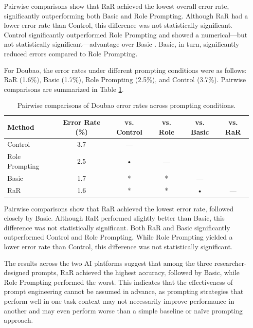 \documentclass[english]{textolivre}
\begin{document}
Pairwise comparisons show that RaR achieved the lowest overall error rate, significantly outperforming both Basic and Role Prompting. Although RaR had a lower error rate than Control, this difference was not statistically significant. Control significantly outperformed Role Prompting and showed a numerical—but not statistically significant—advantage over Basic . Basic, in turn, significantly reduced errors compared to Role Prompting.


For Doubao, the error rates under different prompting conditions were as follows: RaR (1.6\%), Basic (1.7\%), Role Prompting (2.5\%), and Control (3.7\%). Pairwise comparisons are summarized in Table \ref{tab2}.

\begin{table}[htpb]
\centering
\begin{threeparttable}
\caption{Pairwise comparisons of Doubao error rates across prompting conditions.}
\label{tab2}
\begin{tabular}{lccccc} 
\hline
Method         & Error Rate (\%) & vs. Control & vs. Role & vs. Basic & vs. RaR  \\ 
\hline
Control        & 3.7             & —           &          &           &          \\
Role Prompting & 2.5             & •           & —        &           &          \\
Basic          & 1.7             & *           & *        & —         &          \\
RaR            & 1.6             & *           & *        & •          & —        \\
\hline
\end{tabular}
\end{threeparttable}
\end{table}

Pairwise comparisons show that RaR achieved the lowest error rate, followed closely by Basic. Although RaR performed slightly better than Basic, this difference was not statistically significant. Both RaR and Basic significantly outperformed Control and Role Prompting. While Role Prompting yielded a lower error rate than Control, this difference was not statistically significant.

The results across the two AI platforms suggest that among the three researcher-designed prompts, RaR achieved the highest accuracy, followed by Basic, while Role Prompting performed the worst. This indicates that the effectiveness of prompt engineering cannot be assumed in advance, as prompting strategies that perform well in one task context may not necessarily improve performance in another and may even perform worse than a simple baseline or naïve prompting approach.
\end{document}
